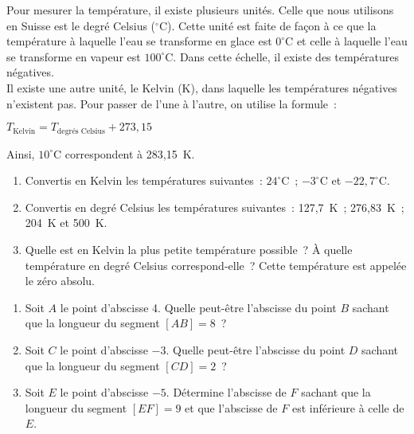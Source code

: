 \begin{exercice}[Températures]
Pour mesurer la température, il existe plusieurs unités. Celle que nous utilisons en Suisse est le degré Celsius ($^\circ$C). Cette unité est faite de façon à ce que la température à laquelle l'eau se transforme en glace est $0^\circ$C et celle à laquelle l'eau se transforme en vapeur est $100^\circ$C. Dans cette échelle, il existe des températures négatives. \\[0.5em]
Il existe une autre unité, le Kelvin (K), dans laquelle les températures négatives n'existent pas. Pour passer de l'une à l'autre, on utilise la formule :

\begin{center} $T_\text{Kelvin} = T_\text{degrés Celsius} + 273,15$ \end{center}
       
Ainsi, $10^\circ$C correspondent à 283,15 K.
\begin{enumerate}
 \item Convertis en Kelvin les températures suivantes : $24^\circ$C ; $-3^\circ$C et $-22,7^\circ$C.
 \item Convertis en degré Celsius les températures suivantes : 127,7 K ; 276,83 K ; 204 K et 500 K.
 \item Quelle est en Kelvin la plus petite température possible ? À quelle température en degré Celsius correspond-elle ? Cette température est appelée le zéro absolu.
 \end{enumerate}
\end{exercice}


\begin{exercice}
\begin{enumerate}
 \item Soit $A$ le point d'abscisse 4. Quelle peut-être l'abscisse du point $B$ sachant que la longueur du segment $[AB] = 8$ ?
 \item Soit $C$ le point d'abscisse $-3$. Quelle peut-être l'abscisse du point $D$ sachant que la longueur du segment $[CD] = 2$ ?
 \item Soit $E$ le point d'abscisse $-5$. Détermine l'abscisse de $F$ sachant que la longueur du segment $[EF] = 9$ et que l'abscisse de $F$ est inférieure à celle de $E$.
 \end{enumerate}
\end{exercice}


